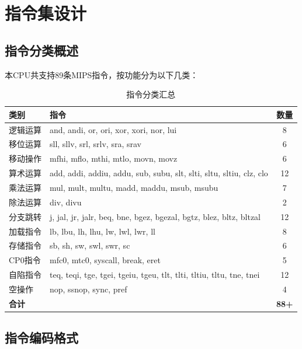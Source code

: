 \section{指令集设计}

\subsection{指令分类概述}

本CPU共支持89条MIPS指令，按功能分为以下几类：

\begin{table}[H]
    \centering
    \caption{指令分类汇总}
    \begin{tabular}{llc}
        \toprule
        \textbf{类别} & \textbf{指令} & \textbf{数量} \\
        \midrule
        逻辑运算 & and, andi, or, ori, xor, xori, nor, lui & 8 \\
        移位运算 & sll, sllv, srl, srlv, sra, srav & 6 \\
        移动操作 & mfhi, mflo, mthi, mtlo, movn, movz & 6 \\
        算术运算 & add, addi, addiu, addu, sub, subu, slt, slti, sltu, sltiu, clz, clo & 12 \\
        乘法运算 & mul, mult, multu, madd, maddu, msub, msubu & 7 \\
        除法运算 & div, divu & 2 \\
        分支跳转 & j, jal, jr, jalr, beq, bne, bgez, bgezal, bgtz, blez, bltz, bltzal & 12 \\
        加载指令 & lb, lbu, lh, lhu, lw, lwl, lwr, ll & 8 \\
        存储指令 & sb, sh, sw, swl, swr, sc & 6 \\
        CP0指令 & mfc0, mtc0, syscall, break, eret & 5 \\
        自陷指令 & teq, teqi, tge, tgei, tgeiu, tgeu, tlt, tlti, tltiu, tltu, tne, tnei & 12 \\
        空操作 & nop, ssnop, sync, pref & 4 \\
        \midrule
        \textbf{合计} & & \textbf{88+} \\
        \bottomrule
    \end{tabular}
\end{table}

\subsection{指令编码格式}


